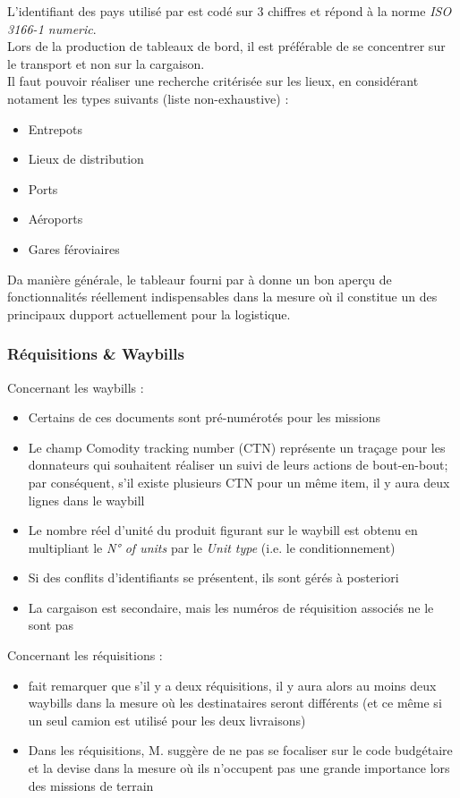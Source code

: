 \documentclass[11pt,fleqn]{report}
\begin{document}
L'identifiant des pays utilisé par \mo est codé sur 3 chiffres et répond à la norme \emph{ISO 3166-1 numeric}.\\
Lors de la production de tableaux de bord, il est préférable de se concentrer sur le transport et non sur la cargaison.\\
Il faut pouvoir réaliser une recherche critérisée sur les lieux, en considérant notament les types suivants (liste non-exhaustive) :
\begin{itemize}
	\item Entrepots
	\item Lieux de distribution
	\item Ports
	\item Aéroports
	\item Gares féroviaires
\end{itemize}
Da manière générale, le tableaur fourni par \mo à \amo donne un bon aperçu de fonctionnalités réellement indispensables dans la mesure où il constitue un des principaux dupport actuellement pour la logistique.


\subsubsection{Réquisitions \& Waybills}

Concernant les waybills :
\begin{itemize}
	\item Certains de ces documents sont pré-numérotés pour les missions
	\item Le champ \og{}Comodity tracking number\fg{} (CTN) représente un traçage pour les donnateurs qui souhaitent réaliser un suivi de leurs actions de bout-en-bout; par conséquent, s'il existe plusieurs CTN pour un même item, il y aura deux lignes dans le waybill
	\item Le nombre réel d'unité du produit figurant sur le waybill est obtenu en multipliant le \emph{N° of units} par le \emph{Unit type} (i.e. le conditionnement)
	\item Si des conflits d'identifiants se présentent, ils sont gérés à posteriori
	\item La cargaison est secondaire, mais les numéros de réquisition associés ne le sont pas
\end{itemize}
Concernant les réquisitions :
\begin{itemize}
	\item \mo fait remarquer que s'il y a deux réquisitions, il y aura alors au moins deux waybills dans la mesure où les destinataires seront différents (et ce même si un seul camion est utilisé pour les deux livraisons)
	\item Dans les réquisitions, M. \Agopian suggère de ne pas se focaliser sur le code budgétaire et la devise dans la mesure où ils n'occupent pas une grande importance lors des missions de terrain
\end{itemize}
\end{document}
